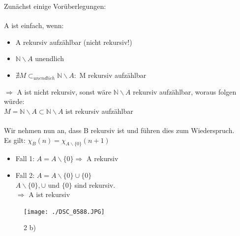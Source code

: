 \documentclass[a4paper]{scrartcl}%
\begin{document}
    Zunächst einige Vorüberlegungen:\\
    \\A ist einfach, wenn:\\
    \begin{itemize}
        \item A rekursiv aufzählbar (nicht rekursiv!)\\
        \item $ \mathds{N}\backslash A$ unendlich\\
        \item $\nexists M \subset_{unendlich} \mathds{N} \backslash A:$ M rekursiv aufzählbar\\
    \end{itemize}
    $\Rightarrow$ A ist nicht rekursiv, sonst wäre $ \mathds{N} \backslash A$ rekursiv aufzählbar, woraus folgen würde:\\
    $M = \mathds{N} \backslash A \subset \mathds{N} \backslash A$ ist rekursiv aufzählbar \lightning\\
    \\Wir nehmen nun an, dass B rekursiv ist und führen dies zum Wiederspruch.\\
    Es gilt: $\chi_B(n) = \chi_{A\backslash \{0\}}(n+1)$\\

    \begin{itemize}
        \item Fall 1: $A = A \backslash \{0\} \Rightarrow$ A rekursiv \lightning\\
        \item Fall 2: $A = A \backslash \{0\} \cup  \{0\}$\\
            $A \backslash \{0\}, \cup \text{ und } \{0\}$ sind rekursiv.\\
            $\Rightarrow$ A ist rekursiv \lightning\\
    \end{itemize}%

\begin{figure}[H]
    \centering
    \texttt{[image: ./DSC\_0588.JPG]}
    \caption{2 b)}
    \label{fig:./DSC_0588}
\end{figure}
\end{document}
